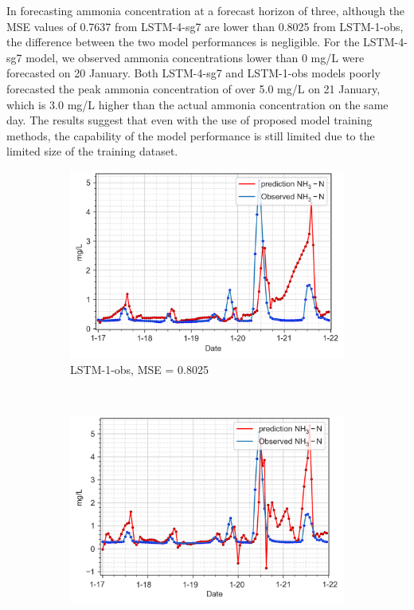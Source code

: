 In forecasting ammonia concentration at a forecast horizon of three, although the MSE values of 0.7637 from LSTM-4-sg7 are lower than 0.8025 from LSTM-1-obs, the difference between the two model performances is negligible. For the LSTM-4-sg7 model, we observed ammonia concentrations lower than 0 mg/L were forecasted on 20 January. Both LSTM-4-sg7 and LSTM-1-obs models poorly forecasted the peak ammonia concentration of over 5.0 mg/L on 21 January, which is 3.0 mg/L higher than the actual ammonia concentration on the same day. The results suggest that even with the use of proposed model training methods, the capability of the model performance is still limited due to the limited size of the training dataset.

\begin{figure}[!ht]
  \centering
  \begin{subfigure}[t]{0.75\textwidth}
    \includegraphics[width=\linewidth]{imgs/results/steps/nh3-lstm-1-fc3.png}
    \caption{LSTM-1-obs, MSE = 0.8025} \label{fig:nh3-lstm-1-fc3}
  \end{subfigure}\\
  \vspace{2em}
  \begin{subfigure}[t]{0.75\textwidth}
    \includegraphics[width=\linewidth]{imgs/results/steps/nh3-lstm-4-fc3.png}

\end{subfigure}
\end{figure}
